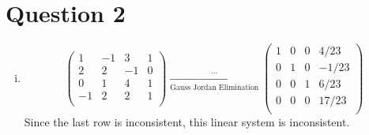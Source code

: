 \documentclass{article}
\begin{document}
\section*{Question 2}
\begin{enumerate}[(i)]
    \item $$\left(\begin{array}{ccc|c}
     1 & -1 & 3 & 1\\
     2 & 2 & -1 & 0\\
     0 & 1 & 4 & 1\\
     -1 & 2 & 2 & 1\\
    \end{array}\right) \xrightarrow[\text{Gauss Jordan Elimination}]{\hdots}\left(\begin{array}{ccc|c}
     1 & 0 & 0 & 4/23\\
     0 & 1 & 0 & -1/23\\
     0 & 0 & 1 & 6/23\\
     0 & 0 & 0 & 17/23\\
    \end{array}\right)
    $$
Since the last row is inconsistent, this linear system is inconsistent.


\end{enumerate}
\end{document}
